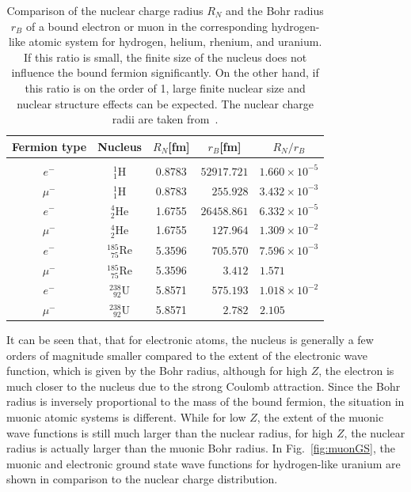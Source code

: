 \begin{table}
\caption{\label{tab:nucl_radii}
Comparison of the nuclear charge radius $R_N$ and the Bohr radius $r_B$ of a bound electron or muon in the corresponding hydrogen-like atomic system for hydrogen, helium, rhenium, and uranium. If this ratio is small, the finite size of the nucleus does not influence the bound fermion significantly. On the other hand, if this ratio is on the order of 1, large finite nuclear size and nuclear structure effects can be expected. The nuclear charge radii are taken from~\cite{Angeli2013}.}
\centering
\begin{tabular}{ccccc}
Fermion type & Nucleus & $R_N$[fm]&$r_B$[fm]&$R_N/r_B$\\\hline\\[-5pt]
$e^-$&$^1_1$H&0.8783&$52917.721$&$1.660\times 10^{-5}$\\[3pt]
$\mu^-$&$^1_1$H&0.8783&$\phantom{11}255.928$&$3.432\times 10^{-3}$\\[15pt]
$e^-$&$^4_2$He&1.6755&$26458.861$&$6.332\times 10^{-5}$\\[3pt]
$\mu^-$&$^4_2$He&1.6755&$\phantom{11}127.964$&$1.309\times 10^{-2}$\\[15pt]
$e^-$&$^{185}_{\phantom{1}75}$Re&5.3596&$\phantom{11}705.570$&$7.596\times 10^{-3}$\\[3pt]
$\mu^-$&$^{185}_{\phantom{1}75}$Re&5.3596&$\phantom{1111}3.412$&$1.571\phantom{111111}$\\[15pt]
$e^-$&$^{238}_{\phantom{1}92}$U&5.8571&$\phantom{11}575.193$&$1.018\times 10^{-2}$\\[3pt]
$\mu^-$&$^{238}_{\phantom{1}92}$U&5.8571&$\phantom{1111}2.782$&$2.105\phantom{111111}$
\end{tabular}
\end{table}
%
%
It can be seen that, that for electronic atoms, the nucleus is generally a few orders of magnitude smaller compared to the extent of the electronic wave function, which is given by the Bohr radius, although for high $Z$, the electron is much closer to the nucleus due to the strong Coulomb attraction. Since the Bohr radius is inversely proportional to the mass of the bound fermion, the situation in muonic atomic systems is different. While for low $Z$, the extent of the muonic wave functions is still much larger than the nuclear radius, for high $Z$, the nuclear radius is actually larger than the muonic Bohr radius. In Fig.~\ref{fig:muonGS}, the muonic and electronic ground state wave functions for hydrogen-like uranium are shown in comparison to the nuclear charge distribution.
